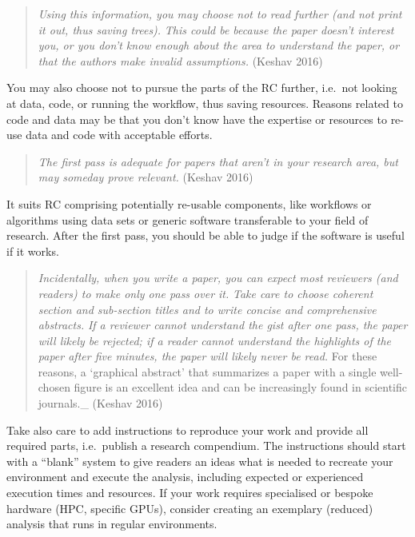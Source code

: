 \documentclass[fleqn,10pt]{wlpeerj} %
\begin{document}
\begin{quote}
\emph{Using this information, you may choose not to read further (and
not print it out, thus saving trees).} \emph{This could be because the
paper doesn't interest you, or you don't know enough about the area to
understand the paper, or that the authors make invalid assumptions.}
(Keshav 2016)
\end{quote}

You may also choose not to pursue the parts of the RC further, i.e.~not
looking at data, code, or running the workflow, thus saving resources.
Reasons related to code and data may be that you don't know have the
expertise or resources to re-use data and code with acceptable efforts.

\begin{quote}
\emph{The first pass is adequate for papers that aren't in your research
area, but may someday prove relevant.} (Keshav 2016)
\end{quote}

It suits RC comprising potentially re-usable components, like workflows
or algorithms using data sets or generic software transferable to your
field of research. After the first pass, you should be able to judge if
the software is useful if it works.

\begin{quote}
\emph{Incidentally, when you write a paper, you can expect most
reviewers (and readers) to make only one pass over it.} \emph{Take care
to choose coherent section and sub-section titles and to write concise
and comprehensive abstracts.} \emph{If a reviewer cannot understand the
gist after one pass, the paper will likely be rejected; if a reader
cannot understand the highlights of the paper after five minutes, the
paper will likely never be read.} For these reasons, a `graphical
abstract' that summarizes a paper with a single well-chosen figure is an
excellent idea and can be increasingly found in scientific journals.\_
(Keshav 2016)
\end{quote}

Take also care to add instructions to reproduce your work and provide
all required parts, i.e.~publish a research compendium. The instructions
should start with a ``blank'' system to give readers an ideas what is
needed to recreate your environment and execute the analysis, including
expected or experienced execution times and resources. If your work
requires specialised or bespoke hardware (HPC, specific GPUs), consider
creating an exemplary (reduced) analysis that runs in regular
environments.
\end{document}
